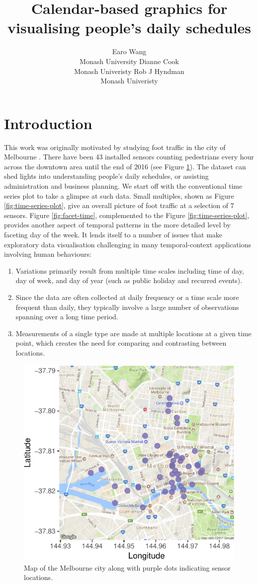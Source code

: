 \documentclass[article]{jss}
\author{
Earo Wang\\Monash University \And Dianne Cook\\Monash Univeristy \And Rob J Hyndman\\Monash Univeristy
}
\title{Calendar-based graphics for visualising people's daily schedules}
\providecommand{\tightlist}{%
  \setlength{\itemsep}{0pt}\setlength{\parskip}{0pt}}
\begin{document}
\section{Introduction}\label{introduction}

This work was originally motivated by studying foot traffic in the city
of Melbourne \citep{ped}. There have been 43 installed sensors counting
pedestrians every hour across the downtown area until the end of 2016
(see Figure \ref{fig:ped-map}). The dataset can shed lights into
understanding people's daily schedules, or assisting administration and
business planning. We start off with the conventional time series plot
to take a glimpse at such data. Small multiples, shown as Figure
\ref{fig:time-series-plot}, give an overall picture of foot traffic at a
selection of 7 sensors. Figure \ref{fig:facet-time}, complemented to the
Figure \ref{fig:time-series-plot}, provides another aspect of temporal
patterns in the more detailed level by faceting day of the week. It
lends itself to a number of issues that make exploratory data
visualisation challenging in many temporal-context applications
involving human behaviours:

\begin{enumerate}
\def\labelenumi{\arabic{enumi}.}
\tightlist
\item
  Variations primarily result from multiple time scales including time
  of day, day of week, and day of year (such as public holiday and
  recurred events).
\item
  Since the data are often collected at daily frequency or a time scale
  more frequent than daily, they typically involve a large number of
  observations spanning over a long time period.
\item
  Measurements of a single type are made at multiple locations at a
  given time point, which creates the need for comparing and contrasting
  between locations.
\end{enumerate}

\begin{CodeChunk}
\begin{figure}

{\centering \includegraphics[width=0.55\linewidth]{figure/ped-map-1} 

}

\caption[Map of the Melbourne city along with purple dots indicating sensor locations]{Map of the Melbourne city along with purple dots indicating sensor locations.}\label{fig:ped-map}
\end{figure}
\end{CodeChunk}
\end{document}
